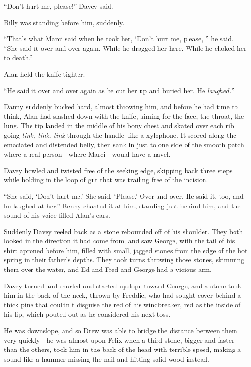 \documentclass{article}
\begin{document}
``Don't hurt me, please!'' Davey said.

Billy was standing before him, suddenly.

``That's what Marci said when he took her, `Don't hurt me, please,'''
he said.  ``She said it over and over again.  While he dragged her
here.  While he choked her to death.''

Alan held the knife tighter.

``He said it over and over again as he cut her up and buried her.  He
\textit{laughed.}''

Danny suddenly bucked hard, almost throwing him, and before he had
time to think, Alan had slashed down with the knife, aiming for the
face, the throat, the lung.  The tip landed in the middle of his bony
chest and skated over each rib, going \textit{tink, tink, tink}
through the handle, like a xylophone.  It scored along the emaciated
and distended belly, then sank in just to one side of the smooth patch
where a real person---where Marci---would have a navel.

Davey howled and twisted free of the seeking edge, skipping back three
steps while holding in the loop of gut that was trailing free of the
incision.

``She said, `Don't hurt me.' She said, `Please.' Over and over.  He
said it, too, and he laughed at her.'' Benny chanted it at him,
standing just behind him, and the sound of his voice filled Alan's
ears.

Suddenly Davey reeled back as a stone rebounded off of his shoulder. 
They both looked in the direction it had come from, and saw George,
with the tail of his shirt aproned before him, filled with small,
jagged stones from the edge of the hot spring in their father's
depths.  They took turns throwing those stones, skimming them over the
water, and Ed and Fred and George had a vicious arm.

Davey turned and snarled and started upslope toward George, and a
stone took him in the back of the neck, thrown by Freddie, who had
sought cover behind a thick pine that couldn't disguise the red of his
windbreaker, red as the inside of his lip, which pouted out as he
considered his next toss.

He was downslope, and so Drew was able to bridge the distance between
them very quickly---he was almost upon Felix when a third stone,
bigger and faster than the others, took him in the back of the head
with terrible speed, making a sound like a hammer missing the nail and
hitting solid wood instead.
\end{document}
